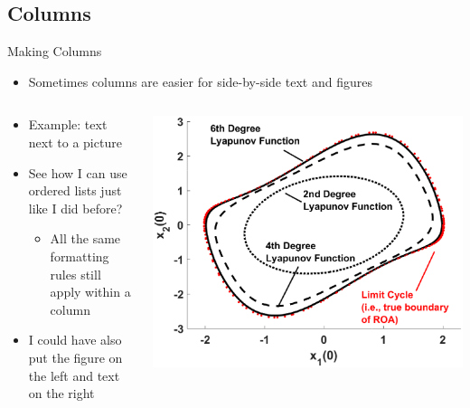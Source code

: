 \subsection{Columns}
\begin{frame}[fragile,t]{Making Columns}
	\begin{itemize}
		\item Sometimes columns are easier for side-by-side text and figures
	\end{itemize}
\vspace{0.2in}
	\begin{columns}
		\begin{column}{0.49\textwidth}
		\begin{itemize}
			\item Example: text next to a picture
			\item See how I can use ordered lists just like I did before?
			\begin{itemize}
				\item All the same formatting rules still apply within a column
			\end{itemize}
			\item I could have also put the figure on the left and text on the right
		\end{itemize}
		\end{column}
		\begin{column}{0.49\textwidth}
		\centering
		\includegraphics[width=0.9\columnwidth]{figures/my_figure.eps} 
		\end{column}
	\end{columns}
\end{frame}

